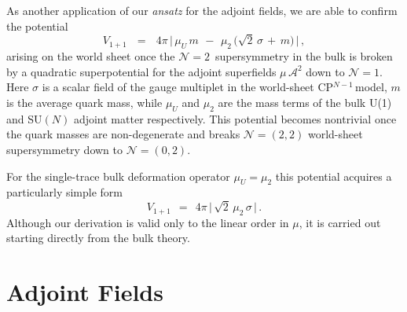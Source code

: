 \documentclass[12pt]{article}
\def\beq{\begin{equation}}
\def\eeq{\end{equation}}
\newcommand{\ntwon}{${\mathcal N}=2$}
\newcommand{\ntwot}{${\mathcal N}= \left(2,2\right) $ }
\newcommand{\ntwoon}{${\mathcal N}= \left(0,2\right)$}
\newcommand{\ca}{{\mathcal A}}
\newcommand{\cpn}{CP$^{N-1}$\,}
\newcommand{\ansatz}{{\it ansatz} }
\begin{document}
	As another application of our \ansatz for the adjoint fields, we are able to confirm the potential 
\beq
\label{Vmu}
	V_{1+1}    \:~~ = ~~\:
	4\pi\, \Big|\, \mu_U\, m  \,~-~\,  \mu_2\, \big( \sqrt{2}\,\sigma \,+\, m \big) \,\Big|\,,
\eeq
	arising on the world sheet \cite{Shifman:2010kr} 
	once the \ntwon\, supersymmetry in the bulk is broken by a quadratic superpotential for the
	adjoint superfields $ \mu\, \ca^2 $ down to ${\mathcal N}=1$.
	Here $\sigma$ is a scalar field of the gauge multiplet in the world-sheet \cpn model, $m$ is the average quark mass,
	while $\mu_U$ and $\mu_2$ are the mass terms of the bulk U(1) and SU$(N)$ adjoint matter respectively. 
	This potential becomes nontrivial once the quark masses are non-degenerate and breaks \ntwot world-sheet supersymmetry down to 
	\ntwoon. 
	
	For the single-trace bulk deformation operator $\mu_U=\mu_2$ this 
	potential acquires a particularly simple form
	\beq
\label{Vmu1}
	V_{1+1}   ~~=~~
	4 \pi\, \Big|\,  \sqrt{2}\, \mu_2\, \sigma  \,\Big|\,.
\eeq
	Although our derivation is valid only to the linear order in $ \mu $, it is carried out
	starting directly from the bulk theory.




\section{Adjoint Fields}
\setcounter{equation}{0}
\end{document}
